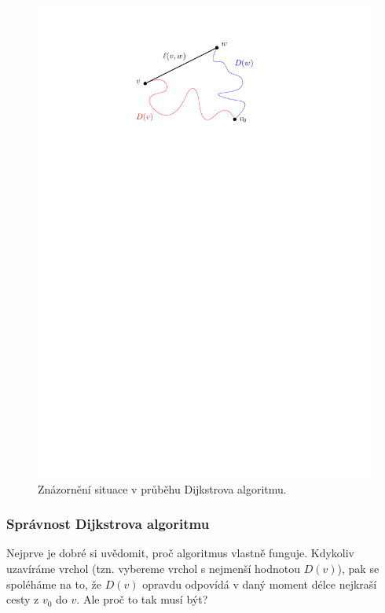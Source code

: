 \begin{figure}[h]
    \centering
    \includegraphics[scale=\graphimgsize]{01-grafalgo/images/ch01_dijkstra_kratsi_cesta.pdf}
    \caption{Znázornění situace v průběhu Dijkstrova algoritmu.}
    \label{fig:dijkstra_kratsi_cesta}
\end{figure}

\subsubsection{Správnost Dijkstrova algoritmu}

Nejprve je dobré si uvědomit, proč algoritmus vlastně funguje. Kdykoliv uzavíráme vrchol (tzn. vybereme vrchol s nejmenší hodnotou $D(v)$), pak se spoléháme na to, že $D(v)$ opravdu odpovídá v daný moment délce nejkraší cesty z $v_0$ do $v$. Ale proč to tak musí být?

